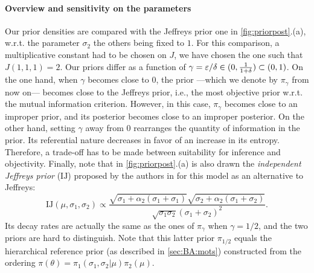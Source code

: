 \paragraph{Overview and sensitivity on the parameters}
Our prior densities are compared with the Jeffreys prior one in \cref{fig:priorpost}.(a), w.r.t. the parameter $\sigma_2$ the others being fixed to $1$. For this comparison, a multiplicative constant had to be chosen on $J$, we have chosen the one such that $J(1,1,1)=2$.
Our priors differ as a function of $\gamma=\varepsilon/\delta\in(0,\frac{1}{1+\delta})\subset(0,1)$. On the one hand, when $\gamma$ becomes close to $0$, the prior ---which we denote by $\pi_\gamma$ from now on--- becomes close to the Jeffreys prior, i.e., the most objective prior w.r.t. the mutual information criterion. However, in this case, $\pi_\gamma$ becomes close to an improper prior, and its posterior becomes close to an improper posterior. On the other hand, setting $\gamma$ away from $0$ 
rearranges the quantity of information in the prior. Its referential nature decreases in favor of an increase in its entropy.
Therefore, a trade-off has to be made between suitability for inference and objectivity.
Finally, note that in \cref{fig:priorpost}.(a) is also drawn the \emph{independent Jeffreys prior} ($\text{IJ}$) proposed by the authors in \cite{rubio_inference_2014} for this model as an alternative to Jeffreys:
        \begin{equation}
            \text{IJ}(\mu,\sigma_1,\sigma_2) \propto \frac{\sqrt{\sigma_1+\alpha_2(\sigma_1+\sigma_1)}\sqrt{\sigma_2+\alpha_2(\sigma_1+\sigma_2)}}{\sqrt{\sigma_1\sigma_2}(\sigma_1+\sigma_2)^2}.
        \end{equation}
Its decay rates are actually the same as the ones of $\pi_\gamma$ when $\gamma=1/2$, and the two priors are hard to distinguish. Note that this latter prior $\pi_{1/2}$ equals the hierarchical reference prior (as described in  \cref{sec:BA:mots}) constructed from the ordering $\pi(\theta)=\pi_1(\sigma_1,\sigma_2|\mu)\pi_2(\mu)$.




